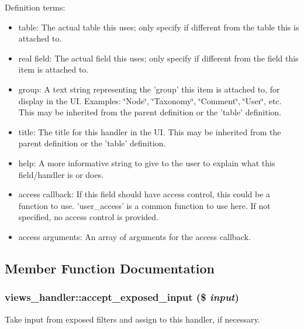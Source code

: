 Definition terms:\begin{itemize}
\item table: The actual table this uses; only specify if different from the table this is attached to.\item real field: The actual field this uses; only specify if different from the field this item is attached to.\item group: A text string representing the 'group' this item is attached to, for display in the UI. Examples: \char`\"{}Node\char`\"{}, \char`\"{}Taxonomy\char`\"{}, \char`\"{}Comment\char`\"{}, \char`\"{}User\char`\"{}, etc. This may be inherited from the parent definition or the 'table' definition.\item title: The title for this handler in the UI. This may be inherited from the parent definition or the 'table' definition.\item help: A more informative string to give to the user to explain what this field/handler is or does.\item access callback: If this field should have access control, this could be a function to use. 'user\_\-access' is a common function to use here. If not specified, no access control is provided.\item access arguments: An array of arguments for the access callback. \end{itemize}


\subsection{Member Function Documentation}
\hypertarget{classviews__handler_20433153babc3196b26ee773755a709e}{
\subsubsection[{accept\_\-exposed\_\-input}]{\setlength{\rightskip}{0pt plus 5cm}views\_\-handler::accept\_\-exposed\_\-input (\$ {\em input})}}
\label{classviews__handler_20433153babc3196b26ee773755a709e}


Take input from exposed filters and assign to this handler, if necessary. 

